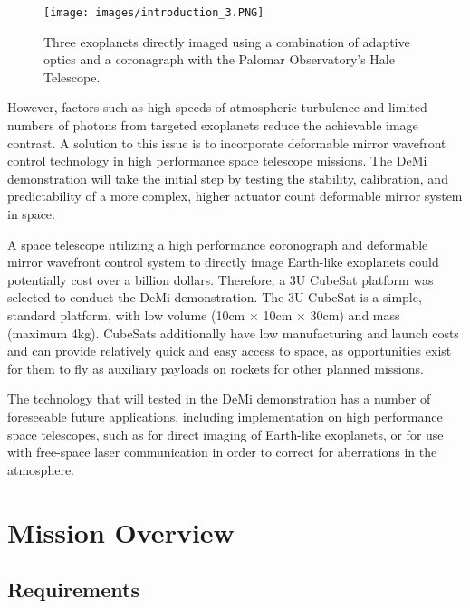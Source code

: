 \documentclass[12pt]{article}
\begin{document}
\begin{figure}[!ht]
\centering
\texttt{[image: images/introduction\_3.PNG]}
\caption{Three exoplanets directly imaged using a combination of adaptive optics and a coronagraph with the Palomar Observatory’s Hale Telescope.}
\label{fig:Intro_exo}
\end{figure}

However, factors such as high speeds of atmospheric turbulence and limited numbers of photons from targeted exoplanets reduce the achievable image contrast.  A solution to this issue is to incorporate deformable mirror wavefront control technology in high performance space telescope missions.  The DeMi demonstration will take the initial step by testing the stability, calibration, and predictability of a more complex, higher actuator count deformable mirror system in space.     

A space telescope utilizing a high performance coronograph and deformable mirror wavefront control system to directly image Earth-like exoplanets could potentially cost over a billion dollars.  Therefore, a 3U CubeSat platform was selected to conduct the DeMi demonstration.  The 3U CubeSat is a simple, standard platform, with low volume (10cm $\times$ 10cm $\times$ 30cm) and mass (maximum 4kg).   CubeSats additionally have low manufacturing and launch costs and can provide relatively quick and easy access to space, as opportunities exist for them to fly as auxiliary payloads on rockets for other planned missions. 

The technology that will tested in the DeMi demonstration has a number of foreseeable future applications, including implementation on high performance space telescopes, such as for direct imaging of Earth-like exoplanets, or for use with free-space laser communication in order to correct for aberrations in the atmosphere.\cite{cahoy-unpublished}

\section{Mission Overview}
		\subsection{Requirements}
		 
\end{document}
